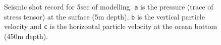 \documentclass[conference]{IEEEtran}
\begin{document}
\begin{figure}
\centering
\captionsetup[subfigure]{labelformat=empty}
\caption{Seismic shot record for 5sec of modelling. \texttt{a} is the
pressure (trace of stress tensor) at the surface (5m depth), \texttt{b}
is the vertical particle velocity and \texttt{c} is the horizontal
particle velocity at the ocean bottom (450m depth).}\label{ElasShot}
\end{figure}
\end{document}
